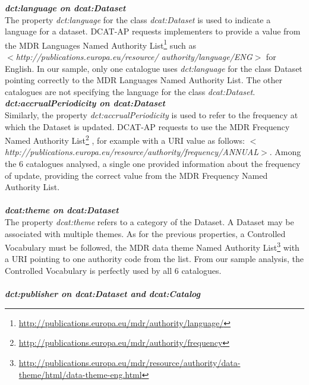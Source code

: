\documentclass[<options>]{elsarticle}
\begin{document}
\textbf{\textit{dct:language on dcat:Dataset}}\\
The property \textit{dct:language} for the class \textit{dcat:Dataset} is used to indicate a language for a dataset. DCAT-AP requests implementers to provide a value from the MDR Languages Named Authority List\footnote{\href{   http://publications.europa.eu/mdr/authority/language/}{    http://publications.europa.eu/mdr/authority/language/}} such as \\
\textit{$<$http://publications.europa.eu/resource/ authority/language/ENG$>$} for English. In our sample, only one catalogue uses \textit{dct:language} for the class Dataset pointing correctly to the MDR Languages Named Authority List. The other catalogues are not specifying the language for the class \textit{dcat:Dataset}.\\
\textbf{\textit{dct:accrualPeriodicity on dcat:Dataset}}\\
Similarly, the property \textit{dct:accrualPeriodicity} is used to refer to the frequency at which the Dataset is updated. DCAT-AP requests to use the MDR Frequency Named Authority List\footnote{\href{    http://publications.europa.eu/mdr/authority/frequency}{     http://publications.europa.eu/mdr/authority/frequency}} , for example with a URI value as follows: \textit{$<$http://publications.europa.eu/resource/authority/frequency/ANNUAL$>$}. Among the 6 catalogues analysed, a single one provided information about the frequency of update, providing the correct value from the MDR Frequency Named Authority List.
\\
\\
\textbf{\textit{dcat:theme on dcat:Dataset}}\\
The property \textit{dcat:theme }refers to a category of the Dataset. A Dataset may be associated with multiple themes. As for the previous properties, a Controlled Vocabulary must be followed, the MDR data theme Named Authority List\footnote{\href{     http://publications.europa.eu/mdr/resource/authority/data-theme/html/data-theme-eng.html}{      http://publications.europa.eu/mdr/resource/authority/data-theme/html/data-theme-eng.html}}  with a URI pointing to one authority code from the list. From our sample analysis, the Controlled Vocabulary is perfectly used by all 6 catalogues.
\\
\\
\textbf{\textit{dct:publisher on dcat:Dataset and dcat:Catalog}}\\
\end{document}
